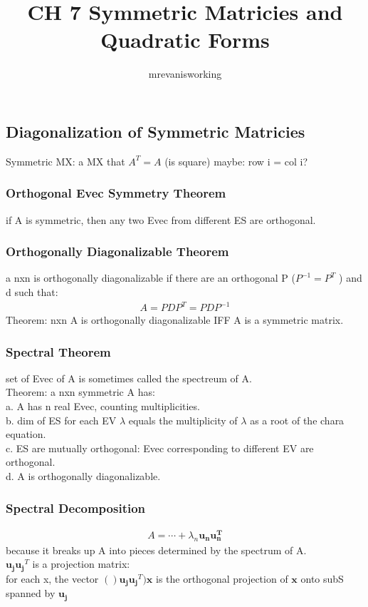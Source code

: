 \documentclass[12pt]{article}
\begin{document}
\title{CH 7 Symmetric Matricies and Quadratic Forms}
\author{mrevanisworking}
\maketitle

\subsection{Diagonalization of Symmetric Matricies}
    Symmetric MX: a MX that $A^T = A$ (is square)
    maybe: row i = col i?
    \subsubsection{Orthogonal Evec Symmetry Theorem}
        if A is symmetric, then any two Evec from different
        ES are orthogonal.
    \subsubsection{Orthogonally Diagonalizable Theorem}
        a nxn is orthogonally diagonalizable if there are
        an orthogonal P ($P^{-1}= P^T$ ) and d such that:
        \begin{align*}
            A= PDP^T = PDP^{-1}
        \end{align*}
        Theorem: nxn A is orthogonally diagonalizable IFF
        A is a symmetric matrix.
    \subsubsection{Spectral Theorem}
        set of Evec of A is sometimes called the spectreum of A.\\
        Theorem: a nxn symmetric A has:\\
        a. A has n real Evec, counting multiplicities.\\
        b. dim of ES for each EV $\lambda $  equals the multiplicity
        of $\lambda $  as a root of the chara equation.\\
        c. ES are mutually orthogonal: Evec corresponding to different
        EV are orthogonal.\\
        d. A is orthogonally diagonalizable.
    \subsubsection{Spectral Decomposition}
        \begin{align*}
            A = \cdots + \lambda _{n}\bm{u_{n}}\bm{u_{n}^{T}}
        \end{align*}
        because it breaks up A into pieces determined by the 
        spectrum of A.\\
        $\bm{u_{j}}\bm{u_{j}}^T$  is a projection matrix:\\
        for each x, the vector $()\bm{u_{j}}\bm{u_{j}}^T)\bm{x}$ is the
        orthogonal projection of $\bm{x}$  onto subS spanned by $\bm{u_{j}}$  
\end{document}
